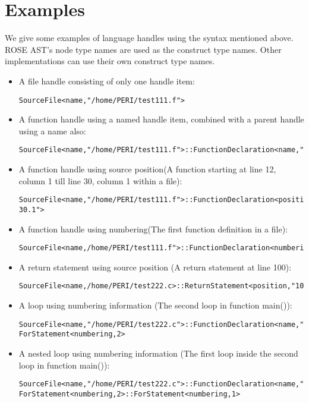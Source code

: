\section{Examples}
We give some examples of language handles using the syntax mentioned above. 
ROSE AST's node type names are used as the construct type names. 
Other implementations can use their own construct type names.

\begin{itemize}
\item A file handle consisting of only one handle item: 
\begin{verbatim}
SourceFile<name,"/home/PERI/test111.f">
\end{verbatim}

\item A function handle using a named handle item, combined with a parent handle using a name also: 

\begin{verbatim}
SourceFile<name,"/home/PERI/test111.f">::FunctionDeclaration<name,"foo">
\end{verbatim}

\item A function handle using source position(A function starting at line 12, column 1 till line 30, column 1 within a file): 

\begin{verbatim}
SourceFile<name,"/home/PERI/test111.f">::FunctionDeclaration<position,"12.1-30.1">

\end{verbatim}
\item A function handle using numbering(The first function definition in a file): 
\begin{verbatim}
SourceFile<name,/home/PERI/test111.f">::FunctionDeclaration<numbering,1>
\end{verbatim}
\item A return statement using source position (A return statement at line 100):
\begin{verbatim}
SourceFile<name,/home/PERI/test222.c>::ReturnStatement<position,"100">

\end{verbatim}
\item A loop using numbering information (The second loop in function
main()): 
\begin{verbatim}
SourceFile<name,"/home/PERI/test222.c">::FunctionDeclaration<name,"main">::
ForStatement<numbering,2>
\end{verbatim}
\item A nested loop using numbering information (The first loop inside the second loop in function
main()): 
\begin{verbatim}
SourceFile<name,"/home/PERI/test222.c">::FunctionDeclaration<name,"main">::
ForStatement<numbering,2>::ForStatement<numbering,1>
\end{verbatim}

\end{itemize}

